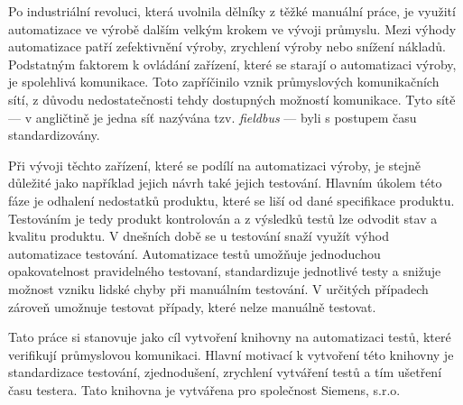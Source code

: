 \begin{introduction}
Po industriální revoluci, která uvolnila dělníky z těžké manuální práce, je využití automatizace ve výrobě dalším velkým krokem ve vývoji průmyslu. 
Mezi výhody automatizace patří zefektivnění výroby, zrychlení výroby nebo snížení nákladů. Podstatným faktorem k ovládání zařízení, které se starají o automatizaci výroby, je spolehlivá komunikace. Toto zapříčinilo vznik průmyslových komunikačních sítí, z důvodu nedostatečnosti tehdy dostupných možností komunikace.
Tyto sítě --- v angličtině je jedna síť nazývána tzv. \textit{fieldbus} --- byli s postupem času standardizovány.

Při vývoji těchto zařízení, které se podílí na automatizaci výroby, je stejně důležité jako například jejich návrh také jejich testování. Hlavním úkolem této fáze je odhalení nedostatků produktu, které se liší od dané specifikace produktu. Testováním je tedy produkt kontrolován a z výsledků testů lze odvodit stav a kvalitu produktu. V dnešních době se u testování snaží využít výhod automatizace testování. Automatizace testů umožňuje jednoduchou opakovatelnost pravidelného testovaní, standardizuje jednotlivé testy a snižuje možnost vzniku lidské chyby při manuálním testování. V určitých případech zároveň umožnuje testovat případy, které nelze manuálně testovat.

Tato práce si stanovuje jako cíl vytvoření knihovny na automatizaci testů, které verifikují průmyslovou komunikaci. Hlavní motivací k vytvoření této knihovny je standardizace testování, zjednodušení, zrychlení vytváření testů a tím ušetření času testera. Tato knihovna je vytvářena pro společnost Siemens, s.r.o.

\end{introduction}
